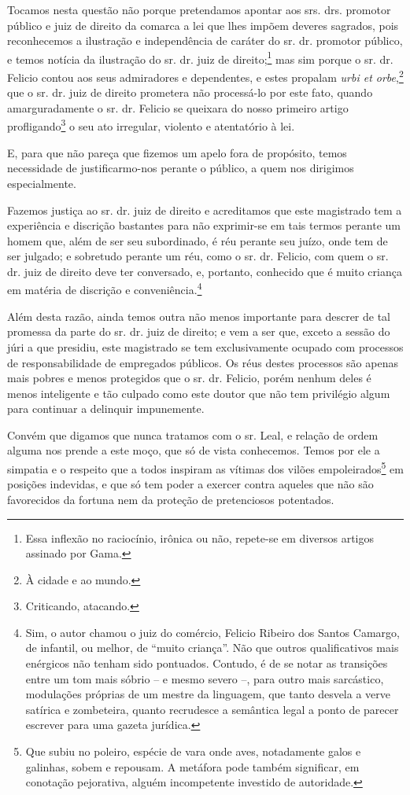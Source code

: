 Tocamos nesta questão não porque pretendamos apontar aos srs. drs.
promotor público e juiz de direito da comarca a lei que lhes impõem
deveres sagrados, pois reconhecemos a ilustração e independência de
caráter do sr. dr. promotor público, e temos notícia da ilustração do
sr. dr. juiz de direito;\footnote{ Essa inflexão no raciocínio, irônica
  ou não, repete-se em diversos artigos assinado por Gama.} mas sim
porque o sr. dr. Felicio contou aos seus admiradores e dependentes, e
estes propalam \emph{urbi et orbe},\footnote{ À cidade e ao mundo.} que
o sr. dr. juiz de direito prometera não processá-lo por este fato,
quando amarguradamente o sr. dr. Felicio se queixara do nosso primeiro
artigo profligando\footnote{ Criticando, atacando.} o seu ato
irregular, violento e atentatório à lei.

E, para que não pareça que fizemos um apelo fora de propósito, temos
necessidade de justificarmo-nos perante o público, a quem nos dirigimos
especialmente.

Fazemos justiça ao sr. dr. juiz de direito e acreditamos que este
magistrado tem a experiência e discrição bastantes para não exprimir-se
em tais termos perante um homem que, além de ser seu subordinado, é réu
perante seu juízo, onde tem de ser julgado; e sobretudo perante um réu,
como o sr. dr. Felicio, com quem o sr. dr. juiz de direito deve ter
conversado, e, portanto, conhecido que é muito criança em matéria de
discrição e conveniência.\footnote{ Sim, o autor chamou o juiz do
  comércio, Felicio Ribeiro dos Santos Camargo, de infantil, ou melhor,
  de ``muito criança''. Não que outros qualificativos mais enérgicos não
  tenham sido pontuados. Contudo, é de se notar as transições entre um
  tom mais sóbrio -- e mesmo severo --, para outro mais sarcástico,
  modulações próprias de um mestre da linguagem, que tanto desvela a
  verve satírica e zombeteira, quanto recrudesce a semântica legal a
  ponto de parecer escrever para uma gazeta jurídica.}

Além desta razão, ainda temos outra não menos importante para descrer de
tal promessa da parte do sr. dr. juiz de direito; e vem a ser que,
exceto a sessão do júri a que presidiu, este magistrado se tem
exclusivamente ocupado com processos de responsabilidade de empregados
públicos. Os réus destes processos são apenas mais pobres e menos
protegidos que o sr. dr. Felicio, porém nenhum deles é menos inteligente
e tão culpado como este doutor que não tem privilégio algum para
continuar a delinquir impunemente.

Convém que digamos que nunca tratamos com o sr. Leal, e relação de ordem
alguma nos prende a este moço, que só de vista conhecemos. Temos por ele
a simpatia e o respeito que a todos inspiram as vítimas dos vilões
empoleirados\footnote{ Que subiu no poleiro, espécie de vara onde aves,
  notadamente galos e galinhas, sobem e repousam. A metáfora pode também
  significar, em conotação pejorativa, alguém incompetente investido de
  autoridade.} em posições indevidas, e que só tem poder a exercer
contra aqueles que não são favorecidos da fortuna nem da proteção de
pretenciosos potentados.

